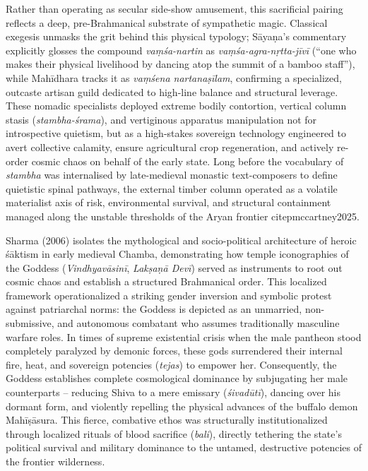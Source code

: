\documentclass[11pt,twoside,letterpaper]{article}
\begin{document}
Rather than operating as secular side-show amusement, this sacrificial pairing reflects a deep, pre-Brahmanical substrate of sympathetic magic. Classical exegesis unmasks the grit behind this physical typology; Sāyaṇa's commentary explicitly glosses the compound \textit{vaṃśa-nartin} as \textit{vaṃśa-agra-nṛtta-jīvī} (``one who makes their physical livelihood by dancing atop the summit of a bamboo staff''), while Mahīdhara tracks it as \textit{vaṃśena nartanaṣīlam}, confirming a specialized, outcaste artisan guild dedicated to high-line balance and structural leverage. These nomadic specialists deployed extreme bodily contortion, vertical column stasis (\textit{stambha-śrama}), and vertiginous apparatus manipulation not for introspective quietism, but as a high-stakes sovereign technology engineered to avert collective calamity, ensure agricultural crop regeneration, and actively re-order cosmic chaos on behalf of the early state. Long before the vocabulary of \textit{stambha} was internalised by late-medieval monastic text-composers to define quietistic spinal pathways, the external timber column operated as a volatile materialist axis of risk, environmental survival, and structural containment managed along the unstable thresholds of the Aryan frontier citep{mccartney2025}.

Sharma (2006) isolates the mythological and socio-political architecture of heroic śāktism in early medieval Chamba, demonstrating how temple iconographies of the Goddess (\textit{Vindhyavāsinī}, \textit{Lakṣaṇā Devī}) served as instruments to root out cosmic chaos and establish a structured Brahmanical order. This localized framework operationalized a striking gender inversion and symbolic protest against patriarchal norms: the Goddess is depicted as an unmarried, non-submissive, and autonomous combatant who assumes traditionally masculine warfare roles. In times of supreme existential crisis when the male pantheon stood completely paralyzed by demonic forces, these gods surrendered their internal fire, heat, and sovereign potencies (\textit{tejas}) to empower her. Consequently, the Goddess establishes complete cosmological dominance by subjugating her male counterparts -- reducing Shiva to a mere emissary (\textit{śivadūtī}), dancing over his dormant form, and violently repelling the physical advances of the buffalo demon Mahīṣāsura. This fierce, combative ethos was structurally institutionalized through localized rituals of blood sacrifice (\textit{bali}), directly tethering the state's political survival and military dominance to the untamed, destructive potencies of the frontier wilderness.
\end{document}
